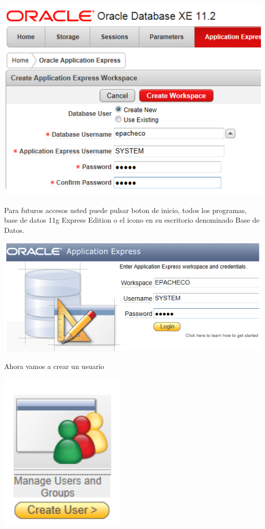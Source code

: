 \documentclass[12pt,letterpaper]{article}
\begin{document}
\begin{center}
\includegraphics[width=15cm]{./IMG/img31}
\end{center}
Para futuros accesos usted puede pulsar boton de inicio, todos los programas, base de datos 11g Express Edition o el icono en su escritorio denominado Base de Datos.
\begin{center}
\includegraphics[width=15cm]{./IMG/img32}
\end{center}
Ahora vamos a crear un usuario
\begin{center}
\includegraphics[width=6cm]{./IMG/img33}
\end{center}
\end{document}
